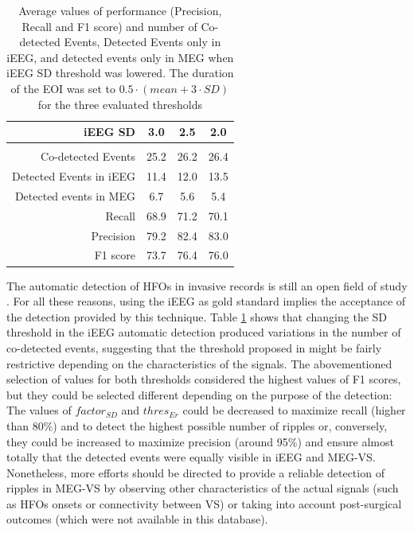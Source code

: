 \begin{table}[!h]
\centering
\caption{Average values of performance (Precision, Recall and F1 score) and number of Co-detected Events, Detected Events only in iEEG, and detected events only in MEG when iEEG SD threshold was lowered.  The duration of the EOI was set to $0.5 \cdot (mean+3\cdot SD)$ for the three evaluated thresholds}
\small
\vspace{3mm}
\label{tbl:3-5}
\begin{tabular}{rccc}
iEEG SD                 & 3.0 & 2.5 & 2.0 \\
\hline 
						&			   &			  &				 \\
Co-detected Events      & 25.2         & 26.2         & 26.4         \\
Detected Events in iEEG & 11.4         & 12.0         & 13.5         \\
Detected events in MEG  & 6.7          & 5.6          & 5.4          \\
Recall                  & 68.9         & 71.2         & 70.1         \\
Precision               & 79.2         & 82.4         & 83.0         \\
F1 score                & 73.7         & 76.4         & 76.0         \\
\end{tabular}
\end{table}

The automatic detection of HFOs in invasive records is still an open field of study \citep{Liu2016,Burnos2014}. For all these reasons, using the iEEG as gold standard implies the acceptance of the detection provided by this technique. Table \ref{tbl:3-5} shows that changing the SD threshold in the iEEG automatic detection produced variations in the number of co-detected events, suggesting that the threshold proposed in \citep{Burnos2014} might be fairly restrictive depending on the characteristics of the signals. The abovementioned selection of values for both thresholds considered the highest values of F1 scores, but they could be selected different depending on the purpose of the detection: The values of $factor_{SD}$ and $thres_{Er}$ could be decreased to maximize recall (higher than 80\%) and to detect the highest possible number of ripples or, conversely, they could be increased to maximize precision (around 95\%) and ensure almost totally that the detected events were equally visible in iEEG and MEG-VS. Nonetheless, more efforts should be directed to provide a reliable detection of ripples in MEG-VS by observing other characteristics of the actual signals (such as HFOs onsets or connectivity between VS) or taking into account post-surgical outcomes (which were not available in this database). 


